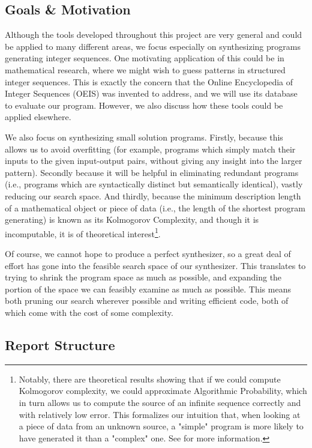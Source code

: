 \subsection{Goals \& Motivation}

Although the tools developed throughout this project are very general and could be applied to many different areas, we focus especially on synthesizing programs generating integer sequences. One motivating application of this could be in mathematical research, where we might wish to guess patterns in structured integer sequences. This is exactly the concern that the Online Encyclopedia of Integer Sequences (OEIS) was invented to address, and we will use its database to evaluate our program. However, we also discuss how these tools could be applied elsewhere.

We also focus on synthesizing small solution programs. Firstly, because this allows us to avoid overfitting (for example, programs which simply match their inputs to the given input-output pairs, without giving any insight into the larger pattern). Secondly because it will be helpful in eliminating redundant programs (i.e., programs which are syntactically distinct but semantically identical), vastly reducing our search space. And thirdly, because the minimum description length of a mathematical object or piece of data (i.e., the length of the shortest program generating) is known as its Kolmogorov Complexity, and though it is incomputable, it is of theoretical interest\footnote{Notably, there are theoretical results showing that if we could compute Kolmogorov complexity, we could approximate Algorithmic Probability, which in turn allows us to compute the source of an infinite sequence correctly and with relatively low error. This formalizes our intuition that, when looking at a piece of data from an unknown source, a "simple" program is more likely to have generated it than a "complex" one. See \cite{Solomonoff} for more information.}.

Of course, we cannot hope to produce a perfect synthesizer, so a great deal of effort has gone into the feasible search space of our synthesizer. This translates to trying to shrink the program space as much as possible, and expanding the portion of the space we can feasibly examine as much as possible. This means both pruning our search wherever possible and writing efficient code, both of which come with the cost of some complexity.

\subsection{Report Structure}

